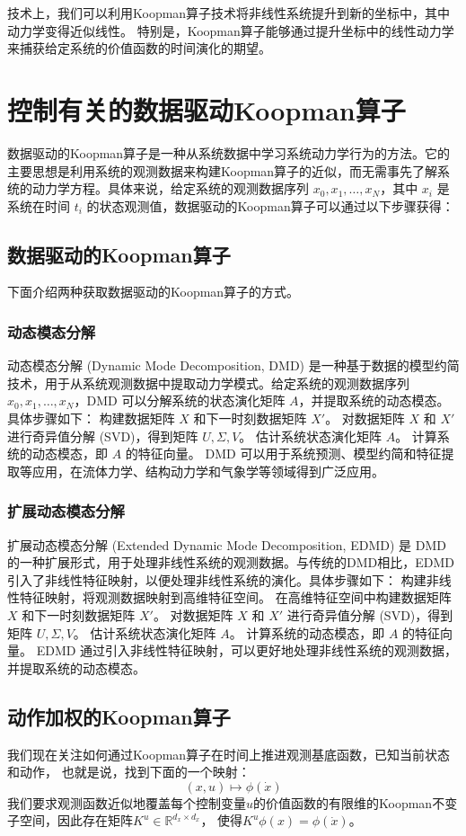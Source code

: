 \documentclass[AutoFakeBold]{LZUThesis}
\begin{document}
技术上，我们可以利用Koopman算子技术将非线性系统提升到新的坐标中，其中动力学变得近似线性。
特别是，Koopman算子能够通过提升坐标中的线性动力学来捕获给定系统的价值函数的时间演化的期望。


\section{控制有关的数据驱动Koopman算子}
数据驱动的Koopman算子是一种从系统数据中学习系统动力学行为的方法。它的主要思想是利用系统的观测数据来构建Koopman算子的近似，而无需事先了解系统的动力学方程。具体来说，给定系统的观测数据序列 ${x_0, x_1, \dots, x_N}$，其中 $x_i$ 是系统在时间 $t_i$ 的状态观测值，数据驱动的Koopman算子可以通过以下步骤获得：
\subsection{数据驱动的Koopman算子}
下面介绍两种获取数据驱动的Koopman算子的方式。
\subsubsection{动态模态分解}
动态模态分解\cite{schmid_dynamic_2010} (Dynamic Mode Decomposition, DMD) 是一种基于数据的模型约简技术，用于从系统观测数据中提取动力学模式。给定系统的观测数据序列 ${x_0, x_1, \dots, x_N}$，DMD 可以分解系统的状态演化矩阵 $A$，并提取系统的动态模态。具体步骤如下：
构建数据矩阵 $X$ 和下一时刻数据矩阵 $X'$。
对数据矩阵 $X$ 和 $X'$ 进行奇异值分解 (SVD)，得到矩阵 $U, \Sigma, V$。
估计系统状态演化矩阵 $A$。
计算系统的动态模态，即 $A$ 的特征向量。
DMD 可以用于系统预测、模型约简和特征提取等应用，在流体力学、结构动力学和气象学等领域得到广泛应用。

\subsubsection{扩展动态模态分解}
扩展动态模态分解\cite{williams_data-driven_2015} (Extended Dynamic Mode Decomposition, EDMD) 是 DMD 的一种扩展形式，用于处理非线性系统的观测数据。与传统的DMD相比，EDMD引入了非线性特征映射，以便处理非线性系统的演化。具体步骤如下：
构建非线性特征映射，将观测数据映射到高维特征空间。
在高维特征空间中构建数据矩阵 $X$ 和下一时刻数据矩阵 $X'$。
对数据矩阵 $X$ 和 $X'$ 进行奇异值分解 (SVD)，得到矩阵 $U, \Sigma, V$。
估计系统状态演化矩阵 $A$。
计算系统的动态模态，即 $A$ 的特征向量。
EDMD 通过引入非线性特征映射，可以更好地处理非线性系统的观测数据，并提取系统的动态模态。
\subsection{动作加权的Koopman算子}
我们现在关注如何通过Koopman算子在时间上推进观测基底函数，已知当前状态和动作，
也就是说，找到下面的一个映射：
\begin{equation}
  (x, u) \mapsto \phi(\dot x)
\end{equation}
我们要求观测函数近似地覆盖每个控制变量$u$的价值函数的有限维的Koopman不变子空间，因此存在矩阵$K^u \in \mathbb{R}^{d_x \times d_x}$，
使得$K^u \phi(x) = \phi(\dot x)$。
\end{document}
